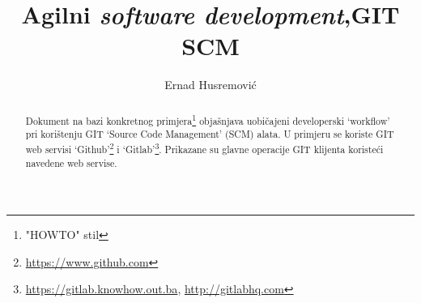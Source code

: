 \documentclass[times, utf8, seminar]{fit}
\begin{document}






\title{Agilni \emph{software development},\newline GIT SCM}

\author{Ernad Husremović}


\maketitle

\tableofcontents

\newpage

\begin{abstract}

Dokument na bazi konkretnog primjera\footnote{"HOWTO" stil} objašnjava uobičajeni developerski `workflow' pri korištenju GIT `Source Code Management' (SCM) alata. 
U primjeru se koriste GIT web servisi `Github'\footnote{\url{https://www.github.com}} i `Gitlab'\footnote{\url{https://gitlab.knowhow.out.ba}, \url{http://gitlabhq.com}}.
Prikazane su glavne operacije GIT klijenta koristeći navedene web servise.


\end{abstract}
\end{document}
